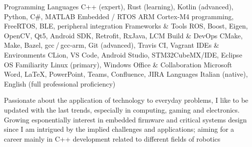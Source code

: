 \begin{cventries}
    
\begin{cvskills}
  \cvskill
    {Programming Languages}
    {C++ (expert), Rust (learning), Kotlin (advanced), Python, C\#, MATLAB}
  \cvskill
    {Embedded / RTOS}
    {ARM Cortex‑M4 programming, FreeRTOS, BLE, peripheral integration}
  \cvskill
    {Frameworks \& Tools}
    {ROS, Boost, Eigen, OpenCV, Qt5, Android SDK, Retrofit, RxJava, LCM}
  \cvskill
    {Build \& DevOps}
    {CMake, Make, Bazel, gcc / gcc‑arm, Git (advanced), Travis CI, Vagrant}
  \cvskill
    {IDEs \& Environments}
    {CLion, VS Code, Android Studio, STM32CubeMX/IDE, Eclipse}
  \cvskill
    {OS Familiarity}
    {Linux (primary), Windows}
  \cvskill
    {Office \& Collaboration}
    {Microsoft Word, \LaTeX, PowerPoint, Teams, Confluence, JIRA}
  \cvskill
    {Languages}
    {Italian (native), English (full professional proficiency)}
\end{cvskills}

\end{cventries}

\begin{cvparagraph}
Passionate about the application of technology to everyday problems, I like to be updated with the last trends, especially in computing, gaming and electronics. Growing esponentially interest in embedded firmware and critical systems design since I am intrigued
by the implied challenges and applications; aiming for a career mainly in C++ development related to different fields of robotics
\end{cvparagraph}
